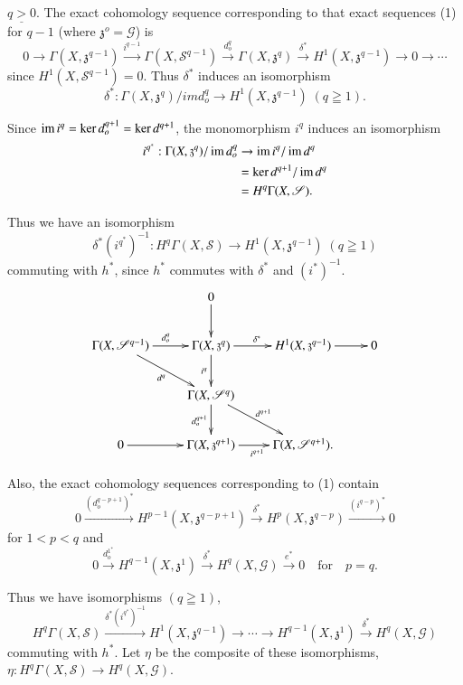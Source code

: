 \medskip
{}
$\underline{q >0}$. The exact cohomology sequence corresponding to
that exact sequences (1) for $q-1$ (where $\mathfrak{z}^o=
\mathscr{G}$) is    
{\fontsize{10}{12}\selectfont
$$ 
0 \to \Gamma (X, \mathfrak{z}^{q-1})  \xrightarrow{i^{q-1}} \Gamma (X,
\mathscr{S}^{q-1}) \xrightarrow{d^q_o} \Gamma (X, \mathfrak{z}^q)
\xrightarrow{\delta^*} H^1(X, \mathfrak{z}^{q-1})  \to 0 \to  \cdots 
$$}\relax
since  $H^1 (X, \mathscr{S}^{q-1})=0$. Thus $\delta^*$ induces an
isomorphism 
$$
\delta^* : \Gamma (X, \mathfrak{z}^q)/  im d^q_o \to  
H^1(X,\mathfrak{z}^{q-1}) \; (q \geqq 1). 
$$
  
  Since $\operatorname{im}  i^q= \ker d^{q+1}_o = \ker d^{q+1}$, the monomorphism
  $i^q$ induces an isomorphism  
  \begin{align*}
  i^{q^*}: \Gamma(X, \mathfrak{z}^q)  / \operatorname{im} d^q_o &\to \operatorname{im}  i^q
 / \operatorname{im} d^q\\ 
  & = \ker d^{q+1} /  \operatorname{im} d^q\\
  & = H^q \Gamma (X,\mathscr{S}).
  \end{align*}
  
  Thus we have an isomorphism
  $$ 
  \delta^* (i^{q^*})^{-1}: H^q \Gamma (X, \mathscr{S}) \to  H^1
  (X,\mathfrak{z}^{q-1}) \;  (q \geqq 1) 
  $$
  commuting with $h^*$, since $h^*$ commutes with $\delta^*$ and
  $(i^*)^{-1}$. 
\[
\xymatrix{
& 0 \ar[d]& & \\
\Gamma(X,\mathscr{S}^{q-1}) \ar[r]^{d^q_o}\ar[dr]_{d^q} & \Gamma
(X,\mathfrak{z}^q) \ar[r]^{\delta^{\ast}} \ar[d]_{i^q} &
H^1(X,\mathfrak{z}^{q-1}) \ar[r] & 0\\ 
& \Gamma(X,\mathscr{S}^q)\ar[d]_{d^{q+1}_o} \ar[dr]^{d^{q+1}} & \\
0 \ar[r] & \Gamma (X,\mathfrak{z}^{q+1}) \ar[r]_{i^{q+1}} & \Gamma
(X,\mathscr{S}^{q+1}). 
}
\]\pageoriginale
  
  Also, the exact cohomology sequences corresponding to (1) contain  
  $$
  0 \xrightarrow{(d^{q-p+1}_o)^*}H^{p-1}(X, \mathfrak{z}^{q-p+1})
  \xrightarrow{\delta^*} H^p(X,\mathfrak{z}^{q-p})
  \xrightarrow{(i^{q-p})^*} 0  
  $$
  for $1< p  < q$ and  
  $$
   0 \xrightarrow{d^{1^*}_o}H^{q-1}(X, \mathfrak{z}^1)
   \xrightarrow{\delta^*} H^q(X,\mathscr{G}) \xrightarrow{e^*} 0 \quad 
   \text{for} \quad p = q. 
  $$
  
  Thus we have isomorphisms $(q \geqq 1)$,
  $$
  H^q \Gamma(X, \mathscr{S}) \xrightarrow{\delta^*(i^{q^*})^{-1}}
  H^1(X,\mathfrak{z}^{q-1})  \to \cdots \to H^{q-1}(X,\mathfrak{z}^1)
  \xrightarrow{\delta^*} H^q(X,\mathscr{G}) 
  $$
  commuting with $h^*$. Let $\eta$ be the composite of these
  isomorphisms,  $\eta: H^q \Gamma(X, \mathscr{S}) \to H^q(X,
  \mathscr{G})$. 
  

